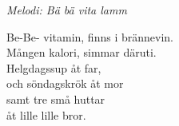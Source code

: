 {\footnotesize\textit{Melodi: Bä bä vita lamm}}\par
\vspace{10pt}
Be-Be- vitamin, finns i brännevin.\\
Mången kalori, simmar däruti.\\
Helgdagssup åt far,\\
och söndagskrök åt mor\\
samt tre små huttar\\
åt lille lille bror.
